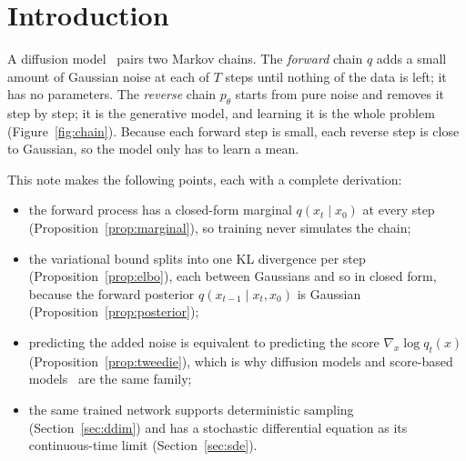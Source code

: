 \newcommand{\E}{\mathbb{E}}
\newcommand{\N}{\mathcal{N}}
\newcommand{\KL}{D_{\mathrm{KL}}}
\newcommand{\abar}{\bar\alpha}
\usetikzlibrary{arrows.meta,positioning}

\begin{abstract}
Diffusion models generate data by learning to undo a fixed process that gradually turns data into Gaussian noise.
This note derives the denoising diffusion probabilistic model (DDPM) from first principles, with every step written out: the closed-form forward marginals, the variational bound and its decomposition into Gaussian KL terms, the Gaussian posterior of the forward process, and the reparameterisation that turns the bound into a noise-prediction loss.
We then show that the optimal noise predictor is a scaled score function (Tweedie's formula), which connects DDPM to denoising score matching, and we derive deterministic DDIM sampling and the continuous-time SDE limit from the same quantities.
\end{abstract}

\section{Introduction}\label{sec:intro}
A diffusion model~\cite{sohl2015,ho2020} pairs two Markov chains.
The \emph{forward} chain $q$ adds a small amount of Gaussian noise at each of $T$ steps until nothing of the data is left; it has no parameters.
The \emph{reverse} chain $p_\theta$ starts from pure noise and removes it step by step; it is the generative model, and learning it is the whole problem (Figure~\ref{fig:chain}).
Because each forward step is small, each reverse step is close to Gaussian, so the model only has to learn a mean.

This note makes the following points, each with a complete derivation:
\begin{itemize}
  \item the forward process has a closed-form marginal $q(x_t \mid x_0)$ at every step (Proposition~\ref{prop:marginal}), so training never simulates the chain;
  \item the variational bound splits into one KL divergence per step (Proposition~\ref{prop:elbo}), each between Gaussians and so in closed form, because the forward posterior $q(x_{t-1} \mid x_t, x_0)$ is Gaussian (Proposition~\ref{prop:posterior});
  \item predicting the added noise is equivalent to predicting the score $\nabla_x \log q_t(x)$ (Proposition~\ref{prop:tweedie}), which is why diffusion models and score-based models~\cite{song2019,song2021sde} are the same family;
  \item the same trained network supports deterministic sampling (Section~\ref{sec:ddim}) and has a stochastic differential equation as its continuous-time limit (Section~\ref{sec:sde}).
\end{itemize}


